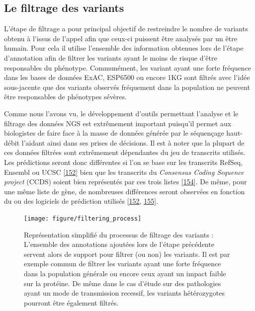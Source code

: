 \documentclass[12pt,twoside]{ugathesis}
\theoremstyle{definition}
\theoremstyle{definition}
\theoremstyle{remark}
\begin{document}
\newpage

\subsection{Le filtrage des variants}\label{le-filtrage-des-variants}

L'étape de filtrage a pour principal objectif de restreindre le nombre
de variants obtenu à l'issus de l'appel afin que ceux-ci puissent être
analysés par un être humain. Pour cela il utilise l'ensemble des
information obtenues lors de l'étape d'annotation afin de filtrer les
variants ayant le moins de risque d'être responsables du phénotype.
Communément, les variant ayant une forte fréquence dans les bases de
données ExAC, ESP6500 ou encore 1KG sont filtrés avec l'idée
sous-jacente que des variants observés fréquement dans la population ne
peuvent être responsables de phénotypes sévères.

Comme nous l'avons vu, le développement d'outils permettant l'analyse et
le filtrage des données NGS est extrêmement important puisqu'il permet
aux biologistes de faire face à la masse de données générée par le
séquençage haut-débit l'aidant ainsi dans ses prises de décisions. Il
est à noter que la plupart de ces données filtrées sont extrêmement
dépendantes du jeu de transcrits utilisés. Les prédictions seront donc
différentes si l'on se base sur les transcrits RefSeq, Ensembl ou UCSC
{[}\protect\hyperlink{ref-McCarthy2014}{152}{]} bien que les transcrits
du \emph{Consensus Coding Sequence project} (CCDS) soient bien
représentés par ces trois listes
{[}\protect\hyperlink{ref-Pruitt2009}{154}{]}. De même, pour une même
liste de gène, de nombreuses différences seront observées en fonction du
ou des logiciels de prédiction utilisés
{[}\protect\hyperlink{ref-McCarthy2014}{152},
\protect\hyperlink{ref-Salgado2016}{155}{]}.

\begin{figure}

{\centering \texttt{[image: figure/filtering\_process]} 

}

\caption[Représentation simplifié du processus de filtrage des variants]{Représentation simplifié du processus de filtrage des variants : L'ensemble des annotations ajoutées lors de l'étape précédente servent alors de support pour filtrer (ou non) les variants. Il est par exemple commun de filtrer les variants ayant une forte fréquence dans la population générale ou encore ceux ayant un impact faible sur la protéine. De même dans le cas d'étude sur des pathologies ayant un mode de transmission recessif, les variants hétérozygotes pourront être également filtrés.}\label{fig:pictfilter}
\end{figure}
\end{document}
